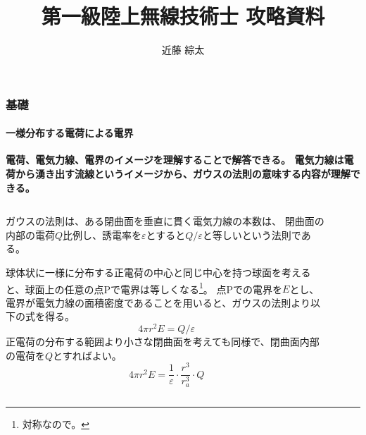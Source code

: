\documentclass[dvipdfmx, 8pt, aspectratio=169]{beamer}
\title{第一級陸上無線技術士 攻略資料}
\author{近藤 綜太}
\date{}
\begin{document}
\frame{\maketitle}

\begin{frame}[t]
  \frametitle{基礎}
  \framesubtitle{一様分布する電荷による電界}

  \textcolor{mri-blue}{
  \textbf{電荷、電気力線、電界のイメージを理解することで解答できる。
  電気力線は電荷から湧き出す流線というイメージから、ガウスの法則の意味する内容が理解できる。
  \vspace{1zh}
  }
  }

  \begin{columns}[]
    \begin{column}{0.55\textwidth}
      ガウスの法則は、ある閉曲面を垂直に貫く電気力線の本数は、
      閉曲面の内部の電荷$Q$比例し、誘電率を$\varepsilon$とすると$Q/\varepsilon$と等しいという法則である。

      球体状に一様に分布する正電荷の中心と同じ中心を持つ球面を考えると、球面上の任意の点Pで電界は等しくなる\footnote{対称なので。}。
      点Pでの電界を$E$とし、電界が電気力線の面積密度であることを用いると、ガウスの法則より以下の式を得る。
      \begin{equation}
        4\pi r^{2} E = Q/\varepsilon
      \end{equation}
      正電荷の分布する範囲より小さな閉曲面を考えても同様で、閉曲面内部の電荷を$Q$とすればよい。
      \begin{equation}
        4\pi r^{2} E = \frac{1}{\varepsilon}  \cdot \frac{r^{3}}{r_{a}^{3}} \cdot Q
      \end{equation}

    \end{column}
    \begin{column}{0.4\textwidth}
      \centering
      \begin{figure}[t]
        \centering
\end{figure}
\end{column}
\end{columns}
\end{frame}
\end{document}
